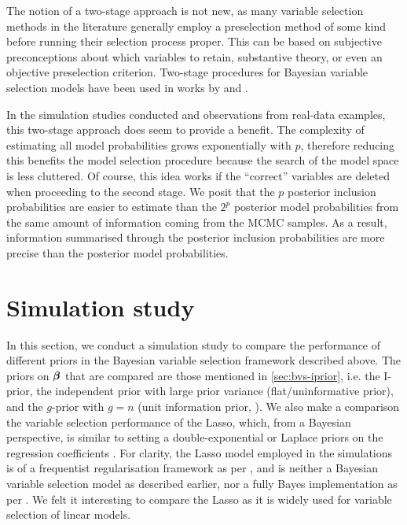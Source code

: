 \documentclass[11pt,twoside,openright]{report}
\begin{document}
The notion of a two-stage approach is not new, as many variable selection methods in the literature generally employ a preselection method of some kind before running their selection process proper.
This can be based on subjective preconceptions about which variables to retain, substantive theory, or even an objective preselection criterion.
Two-stage procedures for Bayesian variable selection models have been used in works by \citet{Fouskakis2008} and \citet{Ntzoufras2008}. 

In the simulation studies conducted and observations from real-data examples, this two-stage approach does seem to provide a benefit.
The complexity of estimating all model probabilities grows exponentially with $p$, therefore reducing this benefits the model selection procedure because the search of the model space is less cluttered.
Of course, this idea works if the ``correct'' variables are deleted when proceeding to the second stage.
We posit that the $p$ posterior inclusion probabilities are easier to estimate than the $2^p$ posterior model probabilities from the same amount of information coming from the MCMC samples.
As a result, information summarised through the posterior inclusion probabilities are more precise than the posterior model probabilities.

\section{Simulation study}

In this section, we conduct a simulation study to compare the performance of different priors in the Bayesian variable selection framework described above.
The priors on ${\bm\beta}$ that are compared are those mentioned in \cref{sec:bvs-iprior}, i.e. the I-prior, the independent prior with large prior variance (flat/uninformative prior), and the $g$-prior with $g=n$ (unit information prior, \cite{Ntzoufras2008}).
We also make a comparison the variable selection performance of the Lasso, which, from a Bayesian perspective, is similar to setting a double-exponential or Laplace priors on the regression coefficients \citep{park2008bayesian}. 
For clarity, the Lasso model employed in the simulations is of a frequentist regularisation framework as per \citet{tibshirani1996regression}, and is neither a Bayesian variable selection model as described earlier, nor a fully Bayes implementation as per \citet{park2008bayesian}.
We felt it interesting to compare the Lasso as it is widely used for variable selection of linear models.
\end{document}
